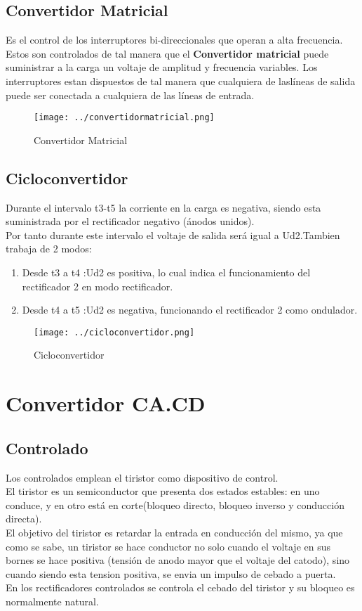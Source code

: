 \documentclass[11pt,a4paper]{article}
\begin{document}
\subsection{Convertidor Matricial}
Es el control de los interruptores bi-direccionales que operan a alta frecuencia. Estos son controlados de tal manera que  el \textbf{Convertidor matricial} puede suministrar  a la carga un voltaje de amplitud y frecuencia variables. Los interruptores estan  dispuestos de tal manera que cualquiera de laslíneas de salida puede ser conectada a cualquiera de las líneas de entrada.

\begin{figure}[h]
\centering
\texttt{[image: ../convertidormatricial.png]}    
\caption{Convertidor Matricial} 
\end{figure} 

\subsection{Cicloconvertidor}
Durante el intervalo t3-t5 la corriente en la carga es negativa, siendo esta  suministrada por el rectificador negativo (ánodos unidos).\\
Por tanto durante este intervalo el voltaje de salida será igual a Ud2.Tambien trabaja de 2 modos:\begin{enumerate}
\item Desde t3 a t4 :Ud2 es positiva, lo cual indica el funcionamiento del rectificador 2 en  modo rectificador.
\item Desde t4 a t5 :Ud2 es negativa, funcionando el rectificador 2 como ondulador.
\end{enumerate}

\begin{figure}[h]
\centering
\texttt{[image: ../cicloconvertidor.png]}   
\caption{Cicloconvertidor} 
\end{figure} 

\section{Convertidor CA.CD}
\subsection{Controlado}
Los controlados emplean el tiristor como dispositivo de control.\\
El tiristor es un semiconductor que presenta dos estados estables: en uno conduce, y en otro está en corte(bloqueo directo, bloqueo inverso y conducción directa).\\
El objetivo del tiristor es retardar la entrada en conducción del mismo, ya que como se sabe, un tiristor se hace conductor no solo cuando el voltaje en sus bornes se hace positiva (tensión de anodo mayor que el voltaje del catodo), sino cuando siendo esta tension positiva, se envia un impulso de cebado a puerta.\\
En los rectificadores controlados se controla el cebado del tiristor y su bloqueo es normalmente natural.
\end{document}
